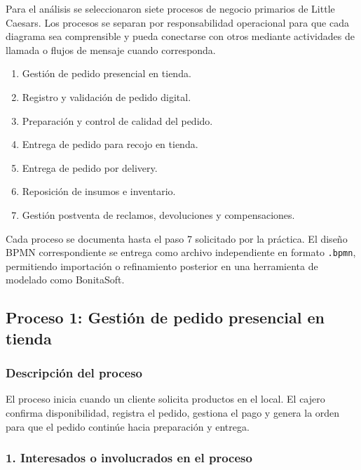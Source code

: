 \documentclass[a4paper,12pt]{article}
\begin{document}
Para el análisis se seleccionaron siete procesos de negocio primarios de Little Caesars. Los procesos se separan por responsabilidad operacional para que cada diagrama sea comprensible y pueda conectarse con otros mediante actividades de llamada o flujos de mensaje cuando corresponda.

\begin{enumerate}
    \item Gestión de pedido presencial en tienda.
    \item Registro y validación de pedido digital.
    \item Preparación y control de calidad del pedido.
    \item Entrega de pedido para recojo en tienda.
    \item Entrega de pedido por delivery.
    \item Reposición de insumos e inventario.
    \item Gestión postventa de reclamos, devoluciones y compensaciones.
\end{enumerate}

Cada proceso se documenta hasta el paso 7 solicitado por la práctica. El diseño BPMN correspondiente se entrega como archivo independiente en formato \texttt{.bpmn}, permitiendo importación o refinamiento posterior en una herramienta de modelado como BonitaSoft.

\subsection*{Proceso 1: Gestión de pedido presencial en tienda}

\subsubsection*{Descripción del proceso}

El proceso inicia cuando un cliente solicita productos en el local. El cajero confirma disponibilidad, registra el pedido, gestiona el pago y genera la orden para que el pedido continúe hacia preparación y entrega.

\subsubsection*{1. Interesados o involucrados en el proceso}
\end{document}
